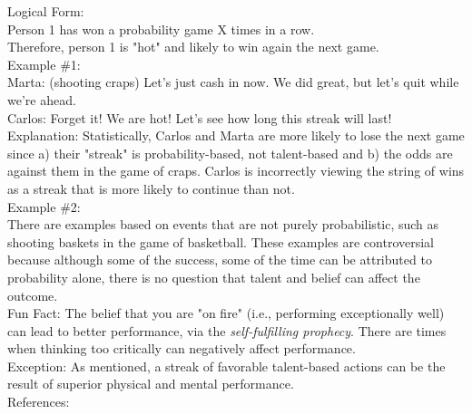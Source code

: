 \documentclass[a4paper,12pt,single,pdftex]{scrartcl}
\begin{document}
    
      Logical Form:
    \\

    
      Person 1 has won a probability game X times in a row.
    \\

    
      Therefore, person 1 is "hot" and likely to win again the next game.
    \\

    
      Example \#1:
    \\

    
      Marta: (shooting craps) Let's just cash in now. We did great, but let's quit while we're ahead.
    \\

    
      Carlos: Forget it! We are hot! Let's see how long this streak will last!
    \\

    
      Explanation: Statistically, Carlos and Marta are more likely to lose the next game since a) their "streak" is probability-based, not talent-based and b) the odds are against them in the game of craps. Carlos is incorrectly viewing the string of wins as a streak that is more likely to continue than not.
    \\

    
      Example \#2:
    \\

    
      There are examples based on events that are not purely probabilistic, such as shooting baskets in the game of basketball. These examples are controversial because although some of the success, some of the time can be attributed to probability alone, there is no question that talent and belief can affect the outcome.
    \\

    
      Fun Fact: The belief that you are "on fire" (i.e., performing exceptionally well) can lead to better performance, via the {\it self-fulfilling prophecy}. There are times when thinking too critically can negatively affect performance.
    \\

    
      Exception: As mentioned, a streak of favorable talent-based actions can be the result of superior physical and mental performance. 
    \\

    References:

    
      
        
      \\
\end{document}
